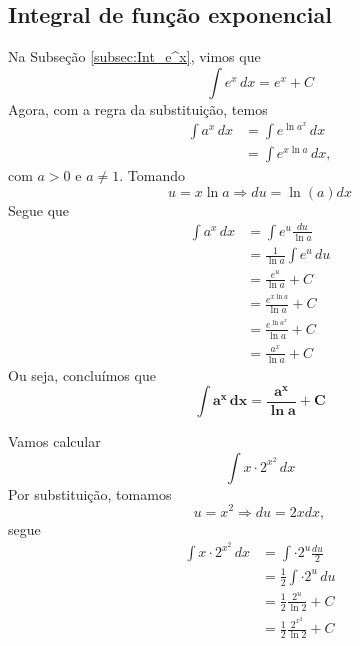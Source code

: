 \cleardoublepage\documentclass[../main.tex]{subfiles}
\begin{document}
\subsection*{Integral de função exponencial}\label{subc:Int-a^x}

Na Subseção \ref{subsec:Int_e^x}, vimos que
\begin{equation*}
  \int e^x\,dx = e^x + C
\end{equation*}
Agora, com a regra da substituição, temos
\begin{align*}
  \int a^x\,dx &= \int e^{\ln a^x}\,dx \\
               &= \int e^{x\ln a}\,dx,
\end{align*}
com $a>0$ e $a\neq 1$. Tomando
\begin{equation*}
  u = x\ln a \Rightarrow du = \ln(a)dx
\end{equation*}
Segue que
\begin{align*}
  \int a^x\,dx &= \int e^u\frac{du}{\ln a} \\
               &= \frac{1}{\ln a}\int e^u\,du \\
               &= \frac{e^u}{\ln a} + C \\
               &= \frac{e^{x\ln a}}{\ln a} + C \\
               &= \frac{e^{\ln a^x}}{\ln a} + C \\
               &= \frac{a^x}{\ln a} + C
\end{align*}
Ou seja, concluímos que
\begin{equation}
  \boldsymbol{\int a^x\,dx = \frac{a^x}{\ln a} + C}
\end{equation}

\begin{ex}
  Vamos calcular
  \begin{equation*}
    \int x\cdot 2^{x^2}\,dx
  \end{equation*}
  Por substituição, tomamos
  \begin{equation*}
    u = x^2 \Rightarrow du = 2xdx,
  \end{equation*}
  segue
  \begin{align*}
    \int x\cdot 2^{x^2}\,dx &= \int \cdot 2^{u}\frac{du}{2} \\
                            &= \frac{1}{2}\int \cdot 2^{u}\,du \\
                            &= \frac{1}{2}\frac{2^u}{\ln 2} + C \\
                            &= \frac{1}{2}\frac{2^{x^2}}{\ln 2} + C
  \end{align*}
\end{ex}
\end{document}
